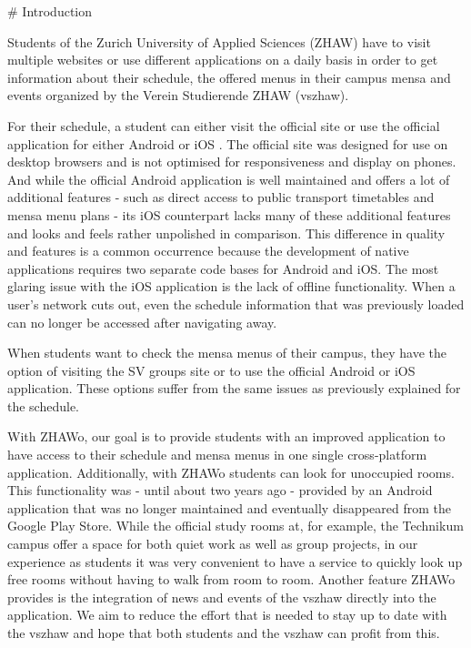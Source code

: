 \begin{markdown}

# Introduction

Students of the Zurich University of Applied Sciences (ZHAW) have to visit multiple websites or use different applications on a daily basis in order to get information about their schedule, the offered menus in their campus mensa and events organized by the Verein Studierende ZHAW (vszhaw).\par

For their schedule, a student can either visit the official site \cite{Stundenplan} or use the official application for either Android \cite{AppAndroid} or iOS \cite{AppIOS}. The official site was designed for use on desktop browsers and is not optimised for responsiveness and display on phones. And while the official Android application is well maintained and offers a lot of additional features - such as direct access to public transport timetables and mensa menu plans - its iOS counterpart lacks many of these additional features and looks and feels rather unpolished in comparison. This difference in quality and features is a common occurrence because the development of native applications requires two separate code bases for Android and iOS. The most glaring issue with the iOS application is the lack of offline functionality. When a user's network cuts out, even the schedule information that was previously loaded can no longer be accessed after navigating away.

When students want to check the mensa menus of their campus, they have the option of visiting the SV groups site or to use the official Android or iOS application. These options suffer from the same issues as previously explained for the schedule.


With ZHAWo, our goal is to provide students with an improved application to have access to their schedule and mensa menus in one single cross-platform application. Additionally, with ZHAWo students can look for unoccupied rooms. This functionality was - until about two years ago - provided by an Android application that was no longer maintained and eventually disappeared from the Google Play Store. While the official study rooms at, for example, the Technikum campus offer a space for both quiet work as well as group projects, in our experience as students it was very convenient to have a service to quickly look up free rooms without having to walk from room to room. Another feature ZHAWo provides is the integration of news and events of the vszhaw directly into the application. We aim to reduce the effort that is needed to stay up to date with the vszhaw and hope that both students and the vszhaw can profit from this.


\end{markdown}
